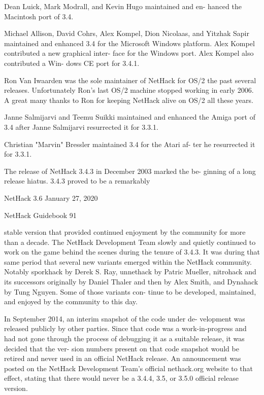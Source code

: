 \documentclass[11pt]{article}
\begin{document}
   Dean Luick, Mark Modrall, and Kevin Hugo maintained and en-
hanced the Macintosh port of 3.4.

   Michael Allison, David Cohrs, Alex Kompel, Dion Nicolaas,
and Yitzhak Sapir maintained and enhanced 3.4 for the Microsoft
Windows platform. Alex Kompel contributed a new graphical inter-
face for the Windows port. Alex Kompel also contributed a Win-
dows CE port for 3.4.1.

   Ron Van Iwaarden was the sole maintainer of NetHack for OS/2
the past several releases. Unfortunately Ron's last OS/2 machine
stopped working in early 2006. A great many thanks to Ron for
keeping NetHack alive on OS/2 all these years.

   Janne Salmijarvi and Teemu Suikki maintained and enhanced
the Amiga port of 3.4 after Janne Salmijarvi resurrected it for
3.3.1.

   Christian "Marvin" Bressler maintained 3.4 for the Atari af-
ter he resurrected it for 3.3.1.

   The release of NetHack 3.4.3 in December 2003 marked the be-
ginning of a long release hiatus. 3.4.3 proved to be a remarkably


NetHack 3.6                   January 27, 2020





NetHack Guidebook                       91



stable version that provided continued enjoyment by the community
for more than a decade. The NetHack Development Team slowly and
quietly continued to work on the game behind the scenes during
the tenure of 3.4.3. It was during that same period that several
new variants emerged within the NetHack community. Notably
sporkhack by Derek S. Ray, unnethack by Patric Mueller, nitrohack
and its successors originally by Daniel Thaler and then by Alex
Smith, and Dynahack by Tung Nguyen. Some of those variants con-
tinue to be developed, maintained, and enjoyed by the community
to this day.

   In September 2014, an interim snapshot of the code under de-
velopment was released publicly by other parties. Since that code
was a work-in-progress and had not gone through the process of
debugging it as a suitable release, it was decided that the ver-
sion numbers present on that code snapshot would be retired and
never used in an official NetHack release. An announcement was
posted on the NetHack Development Team's official nethack.org
website to that effect, stating that there would never be a
3.4.4, 3.5, or 3.5.0 official release version.
\end{document}
